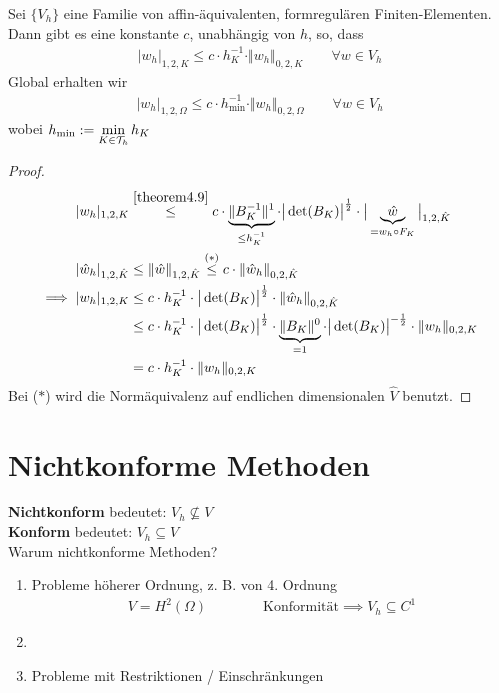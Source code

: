 \begin{lemma}\label{lemma4.19InverseAbschaetzung}\enter
Sei $\lbrace V_h\rbrace$ eine Familie von affin-äquivalenten, formregulären Finiten-Elementen.\\
Dann gibt es eine konstante $c$, unabhängig von $h$, so, dass
\begin{align*}
|w_h|_{1,2,K}\leq c\cdot h^{-1}_K\cdot\Vert w_h\Vert_{0,2,K}\qquad\forall w\in V_h
\end{align*}
Global erhalten wir
\begin{align*}
|w_h|_{1,2,\Omega}\leq c\cdot h^{-1}_{\min}\cdot\Vert w_h\Vert_{0,2,\Omega}\qquad\forall w\in V_h
\end{align*}
wobei $h_{\min}:=\min\limits_{K\in\mathcal{T}_h} h_K$
\end{lemma}
\begin{proof}
\begin{align*}
|w_h|_{1,2,K}
&\stackrel{\ref{theorem4.9}}{\leq}
c\cdot\underbrace{\Vert B_K^{-1}\Vert^1}_{\leq h_K^{-1}}\cdot\big|\det(B_K)\big|^{\frac{1}{2}}\cdot\big|\underbrace{\hat{w}}_{=w_h\circ F_K}\big|_{1,2,\hat{K}}\\
|\hat{w}_h|_{1,2,\hat{K}}
&\leq \Vert\hat{w}\Vert_{1,2,\hat{K}}
\stackrel{(\ast)}{\leq}
c\cdot\Vert\hat{w}_h\Vert_{0,2,\hat{K}}\\
\implies
|w_h|_{1,2,K}
&\leq c\cdot h_K^{-1}\cdot\big|\det(B_K)\big|^{\frac{1}{2}}\cdot\Vert\hat{w}_h\Vert_{0,2,\hat{K}}\\
&\leq c\cdot h_K^{-1}\cdot\big|\det(B_K)\big|^{\frac{1}{2}}\cdot\underbrace{\Vert B_K\Vert^0}_{=1}\cdot\big|\det(B_K)\big|^{-\frac{1}{2}}\cdot\Vert w_h\Vert_{0,2,K}\\
&= c\cdot h_K^{-1}\cdot\Vert w_h\Vert_{0,2,K}
\end{align*}
Bei ($\ast$) wird die Normäquivalenz auf endlichen dimensionalen $\hat{V}$ benutzt.
\end{proof}

\section{Nichtkonforme Methoden}
\textbf{Nichtkonform} bedeutet: $V_h\not\subseteq V$\\
\textbf{Konform} bedeutet: $V_h\subseteq V$\\
Warum nichtkonforme Methoden?
\begin{enumerate}[label=(\roman*)]
\item Probleme höherer Ordnung, z. B. von 4. Ordnung
\begin{align*}
V=H^2(\Omega)\qquad\qquad%
\text{Konformität}\implies V_h\subseteq C^1
\end{align*}
\item %
\item Probleme mit Restriktionen / Einschränkungen
\end{enumerate}


